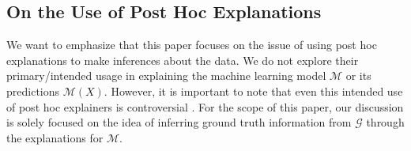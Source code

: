 \documentclass[mnsc,blindrev]{informs3}
\newcommand{\mM}{\mathcal{M}}
\begin{document}
    


    
    
    \subsection{On the Use of Post Hoc Explanations}
  We want to emphasize that this paper focuses on the issue of using post hoc explanations to make inferences about the data. We do not explore their primary/intended usage in explaining the machine learning model $\mM$ or its predictions $\mathcal{M}(X)$. However, it is important to note that even this intended use of post hoc explainers is controversial \citep{garreau2020looking,alvarez18robustness,kumar20shap,jacovi2023diagnosing}. For the scope of this paper, our discussion is solely focused on the idea of inferring ground truth information from $\mathcal{G}$ through the explanations for $\mathcal{M}$. 
\end{document}
